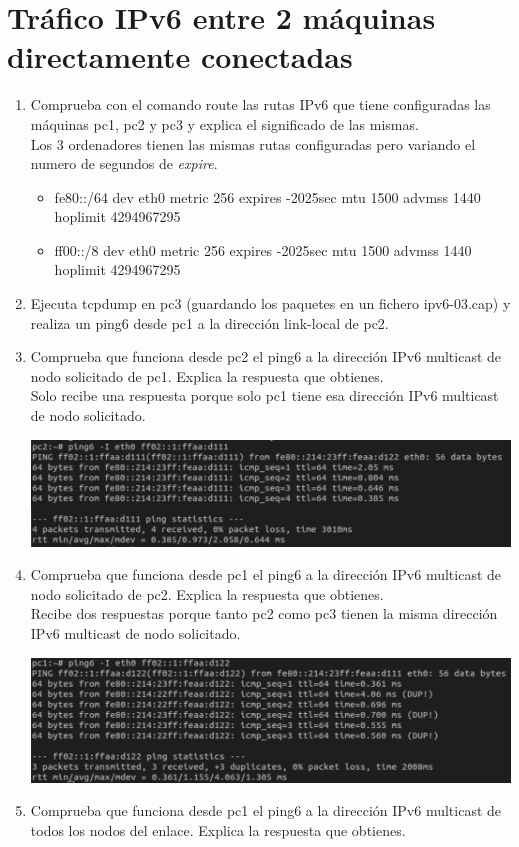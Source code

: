 \documentclass[12pt, a4paper]{report}
\begin{document}
\section{Tráfico IPv6 entre 2 máquinas directamente conectadas}
\begin{enumerate}
	\item Comprueba con el comando route las rutas IPv6 que tiene configuradas las máquinas pc1,
	pc2 y pc3 y explica el significado de las mismas.\\
	Los 3 ordenadores tienen las mismas rutas configuradas pero variando el numero de segundos de \textit{expire}.
	\begin{itemize}
		\item fe80::/64 dev eth0  metric 256  expires -2025sec mtu 1500 advmss 1440 hoplimit 4294967295
		\item ff00::/8 dev eth0  metric 256  expires -2025sec mtu 1500 advmss 1440 hoplimit 4294967295
	\end{itemize}
	\item Ejecuta tcpdump en pc3 (guardando los paquetes en un fichero ipv6-03.cap) y realiza un
	ping6 desde pc1 a la dirección link-local de pc2.
	\item Comprueba que funciona desde pc2 el ping6 a la dirección IPv6 multicast de nodo solicitado
	de pc1. Explica la respuesta que obtienes.\\
	
	Solo recibe una respuesta porque solo pc1 tiene esa dirección IPv6 multicast de nodo solicitado.
	\begin{center}
		\includegraphics[width=1\textwidth]{ej3_1_2}
	\end{center}
	\item Comprueba que funciona desde pc1 el ping6 a la dirección IPv6 multicast de nodo solicitado
	de pc2. Explica la respuesta que obtienes.\\
	
	Recibe dos respuestas porque tanto pc2 como pc3 tienen la misma dirección IPv6 multicast de nodo solicitado.
	\begin{center}
		\includegraphics[width=1\textwidth]{ej4_1_2}
	\end{center}
	\item Comprueba que funciona desde pc1 el ping6 a la dirección IPv6 multicast de todos los nodos
	del enlace. Explica la respuesta que obtienes.\\
	

\end{enumerate}
\end{document}
